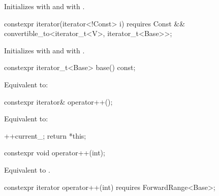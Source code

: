 \begin{itemdescr}
\pnum
\effects Initializes  with  and
 with .
\end{itemdescr}

%
\begin{itemdecl}
constexpr iterator(iterator<!Const> i)
  requires Const && convertible_to<iterator_t<V>, iterator_t<Base>>;
\end{itemdecl}

\begin{itemdescr}
\pnum
\effects Initializes  with  and
 with .
\end{itemdescr}

\begin{itemdecl}
constexpr iterator_t<Base> base() const;
\end{itemdecl}

\begin{itemdescr}
\pnum
\effects Equivalent to: 
\end{itemdescr}

\begin{itemdecl}
constexpr iterator& operator++();
\end{itemdecl}

\begin{itemdescr}
\pnum
\effects Equivalent to:
\begin{codeblock}
++current_;
return *this;
\end{codeblock}
\end{itemdescr}

\begin{itemdecl}
constexpr void operator++(int);
\end{itemdecl}

\begin{itemdescr}
\pnum
\effects Equivalent to .
\end{itemdescr}

\begin{itemdecl}
constexpr iterator operator++(int) requires ForwardRange<Base>;
\end{itemdecl}

